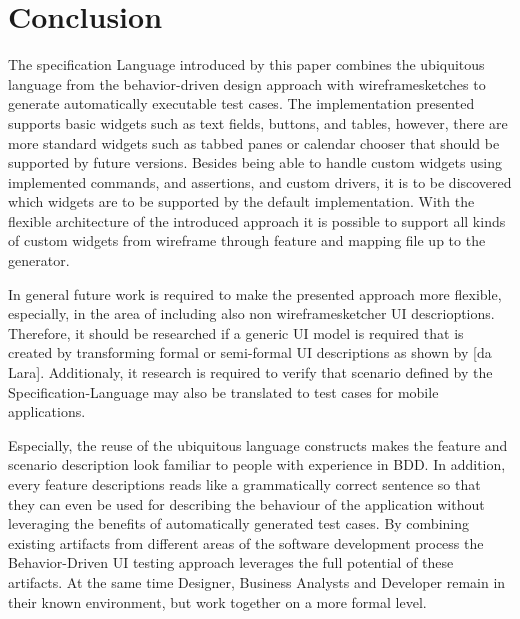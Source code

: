 \documentclass{sig-alternate-05-2015}
\begin{document}
\section{Conclusion}\label{sec:Conclusion} %
The specification Language introduced by this paper combines the ubiquitous language from the behavior-driven design approach with wireframesketches to generate automatically executable test cases.
The implementation presented supports basic widgets such as text fields, buttons, and tables, however, there are more standard widgets such as tabbed panes or calendar chooser that should be supported by future versions.
Besides being able to handle custom widgets using implemented commands, and assertions, and custom drivers, it is to be discovered which widgets are to be supported by the default implementation.
With the flexible architecture of the introduced approach it is possible to support all kinds of custom widgets from wireframe through feature and mapping file up to the generator.

In general future work is required to make the presented approach more flexible, especially, in the area of including also non wireframesketcher UI descrioptions. 
Therefore, it should be researched if a generic UI model is required that is created by transforming formal or semi-formal UI descriptions as shown by [da Lara].
Additionaly, it research is required to verify that scenario defined by the Specification-Language may also be translated to test cases for mobile applications.  

Especially, the reuse of the ubiquitous language constructs makes the feature and scenario description look familiar to people with experience in BDD. 
In addition, every feature descriptions reads like a grammatically correct sentence so that they can even be used for describing the behaviour of the application without leveraging the benefits of automatically generated test cases.
By combining existing artifacts from different areas of the software development process the Behavior-Driven UI testing approach leverages the full potential of these artifacts.
At the same time Designer, Business Analysts and Developer remain in their known environment, but work together on a more formal level. 

\end{document}
